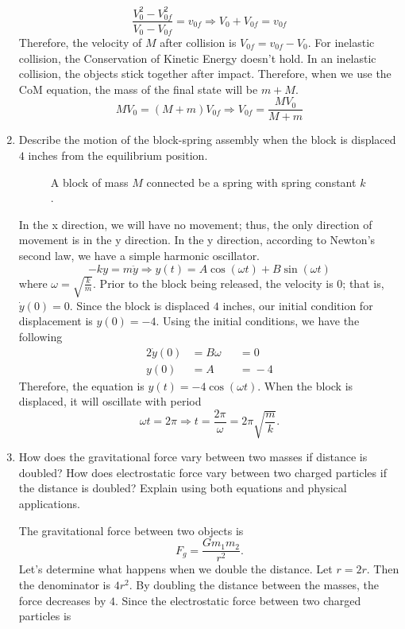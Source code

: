 \begin{enumerate}
  \[
  \frac{V_0^2 - V_{0f}^2}{V_0 - V_{0f}} = v_{0f}\Rightarrow
  V_0 + V_{0f} = v_{0f}
  \]
  Therefore, the velocity of \(M\) after collision is \(V_{0f} = v_{0f} - V_0\).
  For inelastic collision, the Conservation of Kinetic Energy doesn't hold.
  In an inelastic collision, the objects stick together after impact.
  Therefore, when we use the CoM equation, the mass of the final state will be
  \(m + M\).
  \[
  MV_0 = (M + m)V_{0f}\Rightarrow V_{0f} = \frac{MV_0}{M + m}
  \]
\item
  Describe the motion of the block-spring assembly when the block is displaced
  \(4\) inches from the equilibrium position.
  \begin{figure}[H]
    \centering
    
    \caption{A block of mass \(M\) connected be a spring with spring constant
      \(k\).}
  \end{figure}
  In the x direction, we will have no movement; thus, the only direction of
  movement is in the y direction.
  In the y direction, according to Newton's second law, we have a simple harmonic
  oscillator.
  \[
  -ky = m\ddot{y}\Rightarrow y(t) = A\cos(\omega t) + B\sin(\omega t)
  \]
  where \(\omega = \sqrt{\frac{k}{m}}\).
  Prior to the block being released, the velocity is \(0\); that is,
  \(\dot{y}(0) = 0\).
  Since the block is displaced \(4\) inches, our initial condition for
  displacement is \(y(0) = -4\).
  Using the initial conditions, we have the following
  \begin{alignat*}{2}
    \dot{y}(0) &= B\omega && = {} 0\\
    y(0) &= A && = {} -4
  \end{alignat*}
  Therefore, the equation is \(y(t) = -4\cos(\omega t)\).
  When the block is displaced, it will oscillate with period
  \[
  \omega t = 2\pi\Rightarrow t = \frac{2\pi}{\omega} = 2\pi\sqrt{\frac{m}{k}}.
  \]
\item
  How does the gravitational force vary between two masses if distance is 
  doubled?
  How does electrostatic force vary between two charged particles if the
  distance is doubled?
  Explain using both equations and physical applications.
  \par\smallskip
  The gravitational force between two objects is
  \[
  F_g = \frac{Gm_1m_2}{r^2}.
  \]
  Let's determine what happens when we double the distance.
  Let \(r = 2r\).
  Then the denominator is \(4r^2\).
  By doubling the distance between the masses, the force decreases by \(4\).
  Since the electrostatic force between two charged particles is

\end{enumerate}
